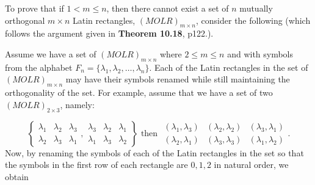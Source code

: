 To prove that if $1 < m \leq n$, then there cannot exist a set of $n$ mutually orthogonal $m \times n$ Latin rectangles, $(MOLR)_{m\times n}$, consider the following (which follows the argument given in \hill \textbf{Theorem 10.18}, p122.).

Assume we have a set of $(MOLR)_{m\times n}$ where $2 \leq m \leq n$ and with symbols from the alphabet $F_n = \{\lambda_1, \lambda_2,\ldots,\lambda_n\}$. Each of the Latin rectangles in the set of $(MOLR)_{m\times n}$ may have their symbols renamed while still maintaining the orthogonality of the set. For example, assume that we have a set of two $(MOLR)_{2\times 3}$, namely:

\begin{equation*}
\left\{
\begin{array}{ccc}
\lambda_1 & \lambda_2 & \lambda_3 \\ 
\lambda_2 & \lambda_3 & \lambda_1
\end{array}
,
\begin{array}{ccc}
\lambda_3 & \lambda_2 & \lambda_1 \\ 
\lambda_1 & \lambda_3 & \lambda_2
\end{array}
\right\}                                                                                                                                                                                                                                                                                                                                                                                                                                                                                                                                                                                                                                                                                                                                                        
\text{ then }
\begin{array}{ccc}
(\lambda_1,\lambda_3) & (\lambda_2,\lambda_2) & (\lambda_3,\lambda_1) \\ 
(\lambda_2,\lambda_1) & (\lambda_3,\lambda_3) & (\lambda_1,\lambda_2)
\end{array}.
\end{equation*}
Now, by renaming the symbols of each of the Latin rectangles in the set so that the symbols in the first row of each rectangle are $0,1,2$ in natural order, we obtain

